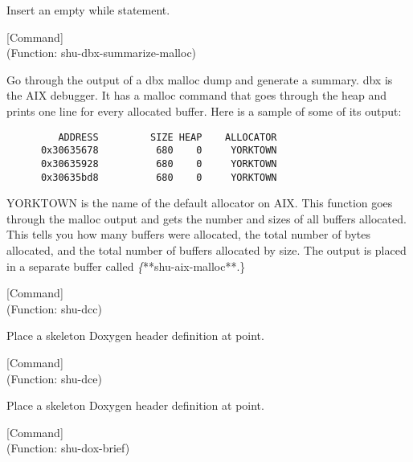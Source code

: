 \begin{doc-string}
Insert an empty while statement.
\end{doc-string}

\vspace{1em}
\noindent
{}
\usebox{\funcname}
 \hfill [Command]\\%
 (Function: shu-dbx-summarize-malloc)

\begin{doc-string}
Go through the output of a dbx malloc dump and generate a summary.  dbx is
the AIX debugger.  It has a malloc command that goes through the heap and prints
one line for every allocated buffer.  Here is a sample of some of its output:

\begin{verbatim}
         ADDRESS         SIZE HEAP    ALLOCATOR
      0x30635678          680    0     YORKTOWN
      0x30635928          680    0     YORKTOWN
      0x30635bd8          680    0     YORKTOWN
\end{verbatim}

YORKTOWN is the name of the default allocator on AIX.  This function goes
through the malloc output and gets the number and sizes of all buffers
allocated.  This tells you how many buffers were allocated, the total number of
bytes allocated, and the total number of buffers allocated by size.  The output
is placed in a separate buffer called \emph\{**shu-aix-malloc**.\}
\end{doc-string}

\vspace{1em}
\noindent
{}
\usebox{\funcname}
 \hfill [Command]\\%
 (Function: shu-dcc)

\begin{doc-string}
Place a skeleton Doxygen header definition at point.
\end{doc-string}

\vspace{1em}
\noindent
{}
\usebox{\funcname}
 \hfill [Command]\\%
 (Function: shu-dce)

\begin{doc-string}
Place a skeleton Doxygen header definition at point.
\end{doc-string}

\vspace{1em}
\noindent
{}
\usebox{\funcname}
 \hfill [Command]\\%
 (Function: shu-dox-brief)

